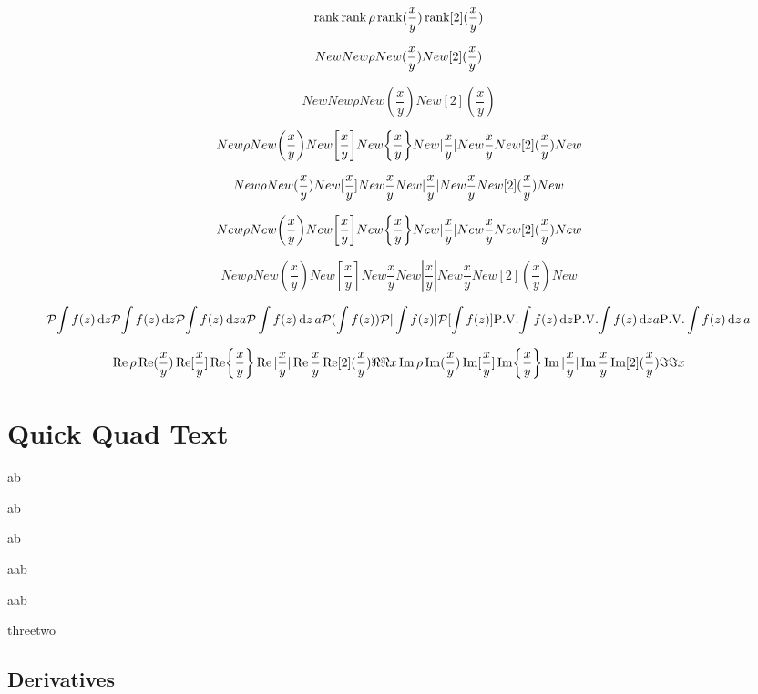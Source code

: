 \documentclass{article}
\begin{document}
\[
  \rank
  \rank\rho
  \rank(\frac{x}{y})
  \rank[2](\frac{x}{y})
\]

\[
  \erf
  \erf\rho
  \erf(\frac{x}{y})
  \erf[2](\frac{x}{y})
\]
\def\erf{New}

\[
  \erf
  \erf\rho
  \erf(\frac{x}{y})
  \erf[2](\frac{x}{y})
\]

\[
  \Res\rho
  \Res(\frac{x}{y})
  \Res[\frac{x}{y}]
  \Res{\frac{x}{y}}
  \Res|\frac{x}{y}|
  \Res \frac{x}{y}
  \Res[2](\frac{x}{y})
  \Res
\]

\[
  \Residue\rho
  \Residue(\frac{x}{y})
  \Residue[\frac{x}{y}]
  \Residue{\frac{x}{y}}
  \Residue|\frac{x}{y}|
  \Residue \frac{x}{y}
  \Residue[2](\frac{x}{y})
  \Residue
\]

\def\Residue{New}

\[
  \Res\rho
  \Res(\frac{x}{y})
  \Res[\frac{x}{y}]
  \Res{\frac{x}{y}}
  \Res|\frac{x}{y}|
  \Res \frac{x}{y}
  \Res[2](\frac{x}{y})
  \Res
\]

\[
  \Residue\rho
  \Residue(\frac{x}{y})
  \Residue[\frac{x}{y}]
  \Residue{\frac{x}{y}}
  \Residue|\frac{x}{y}|
  \Residue \frac{x}{y}
  \Residue[2](\frac{x}{y})
  \Residue
\]


\[
  \principalvalue{\int f(z) \dd{z}}
  \pv{\int f(z) \dd{z}}
  \pv{\int f(z) \dd{z}}a
  \pv\int f(z) \dd{z}a
  \pv(\int f(z))
  \pv|\int f(z)|
  \pv[\int f(z)]
  \PV{\int f(z) \dd{z}}
  \PV{\int f(z) \dd{z}}a
  \PV\int f(z) \dd{z}a
\]

\[
  \Re\rho
  \Re(\frac{x}{y})
  \Re[\frac{x}{y}]
  \Re{\frac{x}{y}}
  \Re|\frac{x}{y}|
  \Re \frac{x}{y}
  \Re[2](\frac{x}{y})
  \real
  \real{x}
  \Im\rho
  \Im(\frac{x}{y})
  \Im[\frac{x}{y}]
  \Im{\frac{x}{y}}
  \Im|\frac{x}{y}|
  \Im \frac{x}{y}
  \Im[2](\frac{x}{y})
  \imaginary
  \imaginary{x}
\]


\newpage
\section*{Quick Quad Text}

\qcc
\qand
a\qc b

ab

ab

a\qqtext ab

a\qqtext* ab

three\qif two



\newpage
\subsection*{Derivatives}
\end{document}
